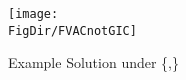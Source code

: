 \hypertarget{FVACnotGIC}{}
\begin{figure}[tbp]
\centerline{\texttt{[image: \\FigDir/FVACnotGIC]}}
\caption{Example Solution under \{\FVAC,\cncl{\GICNrm}\}}
\label{fig:FVACnotGIC}
\end{figure}
